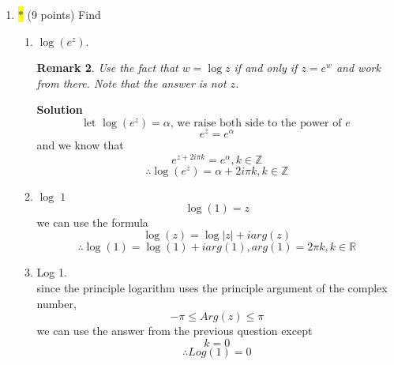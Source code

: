 \documentclass[12pt]{article}
\newtheorem*{remark}{Remark}
\begin{document}
\begin{enumerate}
\begin{enumerate}
    
    \item  $u(z) = e^{x} \cos y$.  That is, find a function $v(z)$ such that $f(z) = e^{x} \cos y + i v(z)$ is analytic in the complex plane.
\\
\textbf{Solution}\\
similar to previous question, we can establish the following equation based on the Cauchy-Riemann Equation\[
u_x(x,y)=e^x\cos(y)=v_y(x,y)
\]\[
-u_v(x,y)=e^x\sin(y)=v_x(x,y)
\]we integrate both side as below\[
\int v_y(x,y)dy=e^x\sin(y)+g(x)
\]\[
\int v_x(x,y)dx=e^x\sin(y)+h(y)
\]we can see that\[
g(x)=h(y)=C, C\in\mathbb{R}
\]and thus we can determine that the harmonic conjugate of $u(x,y)$ is\[
v(x,y)=e^x\sin(y)+C,C\in\mathbb{R}
\]and is part of the holographic function\[
f(z)=e^x\cos(y)+i(e^x\sin(y)+C),C\in\mathbb{R}
\]

    
\end{enumerate}  

\begin{remark}
    Don't just state the function $v(z)$.  I want to see the work on how you found the harmonic conjugate.  Think Cauchy-Riemann equations.  
\end{remark}

\item \colorbox{yellow}{$\ast$} (9 points) Find 
\begin{enumerate}
    \item $\log(e^{z})$.  
    \begin{remark}
        Use the fact that $w = \log z$ if and only if $z = e^{w}$ and work from there.  Note that the answer is not $z$.   
    \end{remark}
    \textbf{Solution}\\
    \[
    \text{let $\log(e^z)=\alpha$, we raise both side to the power of $e$}
    \]\[
    e^z=e^\alpha
    \]and we know that
    \[
    e^{z+2i\pi k}=e^\alpha, k\in\mathbb{Z}
    \]
    \[
    \therefore \log(e^z)=\alpha+2i\pi k,k\in\mathbb{Z}
    \]
    \item $\log \; 1$
    \[
    \log(1)=z
    \]we can use the formula
    \[
    \log(z)=\log|z|+iarg(z)
    \]\[
    \therefore \log(1)=\log(1)+iarg(1), arg(1)=2\pi k, k\in \mathbb{R}
    \]
    \item Log  1.
    \\
    since the principle logarithm uses the principle argument of the complex number,\[
    -\pi \leq Arg(z) \leq \pi
    \]we can use the answer from the previous question except\[
    k=0
    \]
    \[
    \therefore Log(1)=0
    \]
\end{enumerate} 


\end{enumerate}
\end{document}
